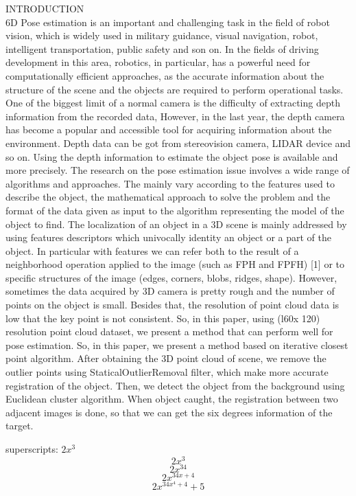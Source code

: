 \documentclass[10]{article}
\begin{document}
INTRODUCTION\\ 
6D Pose estimation is an important and challenging task in the field of robot vision, which is widely used in military guidance, visual navigation, robot, intelligent transportation, public safety and son on. In the fields of driving development in this area, robotics, in particular, has a powerful need for computationally efficient approaches, as the accurate information about the structure of the scene and the objects are required to perform operational tasks. One of the biggest limit of a normal camera is the difficulty of extracting depth information from the recorded data, However, in the last year, the depth camera has become a popular and accessible tool for acquiring information about the environment. Depth data can be got from stereovision camera, LIDAR device and so on. Using the depth information to estimate the object pose is available and more precisely. The research on the pose estimation issue involves a wide range of algorithms and approaches. The mainly vary according to the features used to describe the object, the mathematical approach to solve the problem and the format of the data given as input to the algorithm representing the model of the object to find. The localization of an object in a 3D scene is mainly addressed by using features descriptors which univocally identity an object or a part of the object. In particular with features we can refer both to the result of a neighborhood operation applied to the image (such as FPH and FPFH) [1] or to specific structures of the image (edges, corners, blobs, ridges, shape). However, sometimes the data acquired by 3D camera is pretty rough and the number of points on the object is small. Besides that, the resolution of point cloud data is low that the key point is not consistent. So, in this paper, using (l60x 120) resolution point cloud dataset, we present a method that can perform well for pose estimation. So, in this paper, we present a method based on iterative closest point algorithm. After obtaining the 3D point cloud of scene, we remove the outlier points using StaticalOutlierRemoval filter, which make more accurate registration of the object. Then, we detect the object from the background using Euclidean cluster algorithm. When object caught, the registration between two adjacent images is done, so that we can get the six degrees information of the target. 

\iffalse superscripts: $2x^3$
$$2x^3$$
$$2x^{34}$$
$$2x^{34x+4}$$
$$2x^{34x^4+4}+5$$
\end{document}
